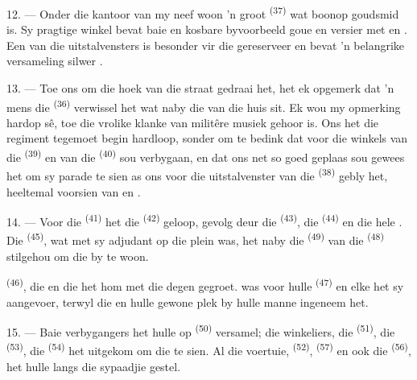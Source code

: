 12. --- Onder die kantoor van my neef woon 'n groot 
\textsuperscript{(37)} wat boonop goudsmid is. Sy pragtige winkel bevat baie
  en kosbare
 byvoorbeeld  goue  en
 versier met  en . Een van die
uitstalvensters is besonder vir die  gereserveer en bevat 'n belangrike
versameling silwer .

13. --- Toe ons om die hoek van die straat gedraai het, het ek opgemerk dat 'n mens die
 \textsuperscript{(36)} verwissel het wat naby die  van
die huis sit. Ek wou my opmerking hardop sê, toe die vrolike klanke van 
militêre musiek gehoor is. Ons het die regiment tegemoet begin hardloop, sonder om te
bedink dat  voor die winkels van die 
\textsuperscript{(39)} en van die  \textsuperscript{(40)} sou
verbygaan, en dat ons net so goed geplaas sou gewees het om sy parade te sien as ons voor
die uitstalvenster van die  \textsuperscript{(38)} gebly het, heeltemal
voorsien van  en .

\VUsaut{3.0mm}

14. --- Voor die  \textsuperscript{(41)} het die 
\textsuperscript{(42)} geloop, gevolg deur die 
\textsuperscript{(43)}, die  \textsuperscript{(44)} en die hele
. Die  \textsuperscript{(45)}, wat met sy adjudant
op die plein was, het naby die  \textsuperscript{(49)} van die
 \textsuperscript{(48)} stilgehou om die  by te woon.

 \textsuperscript{(46)}, die  en die
 het hom met die degen gegroet.  was voor
hulle  \textsuperscript{(47)} en elke  het sy
 aangevoer, terwyl die   en
 hulle gewone plek by hulle manne ingeneem het.

15. --- Baie verbygangers het hulle op  \textsuperscript{(50)}
versamel; die winkeliers, die  \textsuperscript{(51)}, die
 \textsuperscript{(53)}, die  \textsuperscript{(54)} het
uitgekom om die  te sien. Al die voertuie, 
\textsuperscript{(52)},  \textsuperscript{(57)} en ook die
 \textsuperscript{(56)}, het hulle langs die sypaadjie gestel.


